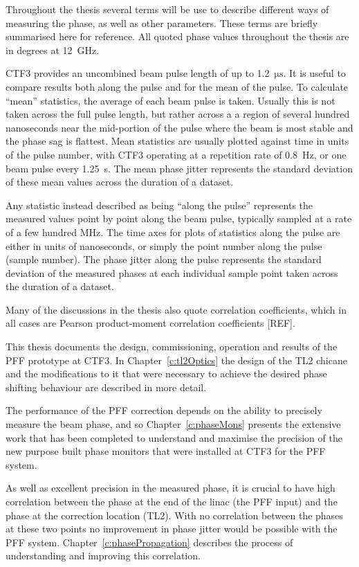 Throughout the thesis several terms will be use to describe different ways of measuring the phase, as well as other parameters. These terms are briefly summarised here for reference. All quoted phase values throughout the thesis are in degrees at 12~GHz.

CTF3 provides an uncombined beam pulse length of up to 1.2~\(\mathrm{\mu s}\). It is useful to compare results both along the pulse and for the mean of the pulse. To calculate ``mean'' statistics, the average of each beam pulse is taken. Usually this is not taken across the full pulse length, but rather across a a region of several hundred nanoseconds near the mid-portion of the pulse where the beam is most stable and the phase sag is flattest. Mean statistics are usually plotted against time in units of the pulse number, with CTF3 operating at a repetition rate of 0.8~Hz, or one beam pulse every 1.25~s. The mean phase jitter represents the standard deviation of these mean values across the duration of a dataset.

Any statistic instead described as being ``along the pulse'' represents the measured values point by point along the beam pulse, typically sampled at a rate of a few hundred MHz. The time axes for plots of statistics along the pulse are either in units of nanoseconds, or simply the point number along the pulse (sample number). The phase jitter along the pulse represents the standard deviation of the measured phases at each individual sample point taken across the duration of a dataset.

Many of the discussions in the thesis also quote correlation coefficients, which in all cases are Pearson product-moment correlation coefficients [REF].


This thesis documents the design, commissioning, operation and results of the PFF prototype at CTF3. In Chapter~\ref{c:tl2Optics} the design of the TL2 chicane and the modifications to it that were necessary to achieve the desired phase shifting behaviour are described in more detail. 

The performance of the PFF correction depends on the ability to precisely measure the beam phase, and so Chapter~\ref{c:phaseMons} presents the extensive work that has been completed to understand and maximise the precision of the new purpose built phase monitors that were installed at CTF3 for the PFF system. 

As well as excellent precision in the measured phase, it is crucial to have high correlation between the phase at the end of the linac (the PFF input) and the phase at the correction location (TL2). With no correlation between the phases at these two points no improvement in phase jitter would be possible with the PFF system. Chapter~\ref{c:phasePropagation} describes the process of understanding and improving this correlation.

